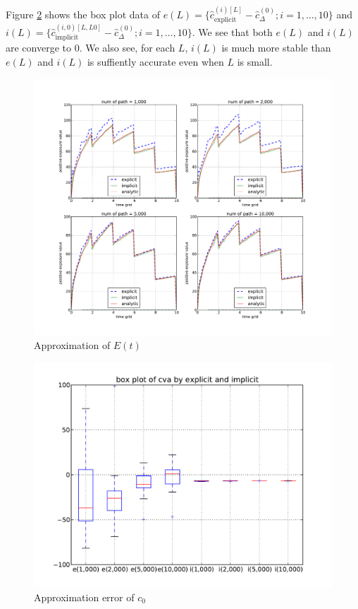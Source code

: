 \documentclass[12pt]{article}
\begin{document}
Figure \ref{fig2} shows the box plot data of  $e(L)= \{\hat{c}_{\text{explicit}}^{(i)[L]}- \hat{c}_{\Delta}^{(0)}; i = 1, \dots, 10\}$ and $i(L)=\{\hat{c}_{\text{implicit}}^{(i, 0)[L, L0]}- \hat{c}_{\Delta}^{(0)}; i = 1, \dots, 10\}$. We see that both $e(L)$ and $i(L)$ are
converge to $0$. We also see, for each $L$, $i(L)$ is much more stable than $e(L)$ and 
$i(L)$ is suffiently accurate even when $L$ is small.
\begin{figure}[htbp]
\begin{center}
\includegraphics[width=18cm]{exposureAll.pdf}
\caption{Approximation of $E(t)$}\label{fig1}
\end{center}
\end{figure} 


\begin{figure}[htbp]
\begin{center}
\includegraphics[width=12cm]{BoxplotCva.pdf}
\caption{Approximation error of $c_0$} \label{fig2}
\end{center}
\end{figure} 



 \newpage
\nocite{*}

 
\end{document}
